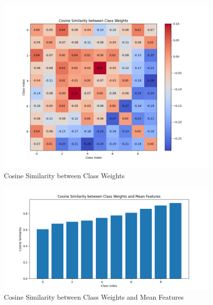 \documentclass{article}
\begin{document}
\begin{multicols}{2}
\columnbreak
\begin{figure}[H]
\centering
\includegraphics[width=\linewidth]{Plot/VS/VS_cos_190_gm015_tau125.png}
\caption{Cosine Similarity between Class Weights}
\end{figure}
\begin{figure}[H]
\centering
\includegraphics[width=\linewidth]{Plot/VS/VS_WiHi_190_gm015_tau125.png}
\caption{Cosine Similarity between Class Weights and Mean Features}
\end{figure}

\end{multicols} %





\newpage
\end{document}
